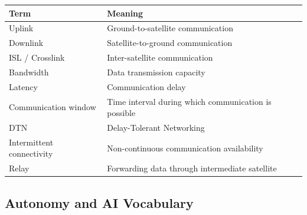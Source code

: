 \documentclass[10pt,a4paper,twocolumn]{article}
\begin{document}
\begin{tabularx}{\columnwidth}{lX}
    \toprule
    Term                      & Meaning                                              \\
    \midrule
    Uplink                    & Ground-to-satellite communication                    \\
    Downlink                  & Satellite-to-ground communication                    \\
    ISL / Crosslink           & Inter-satellite communication                        \\
    Bandwidth                 & Data transmission capacity                           \\
    Latency                   & Communication delay                                  \\
    Communication window      & Time interval during which communication is possible \\
    DTN                       & Delay-Tolerant Networking                            \\
    Intermittent connectivity & Non-continuous communication availability            \\
    Relay                     & Forwarding data through intermediate satellite       \\
    \bottomrule
\end{tabularx}


\subsection{Autonomy and AI Vocabulary}
\end{document}
